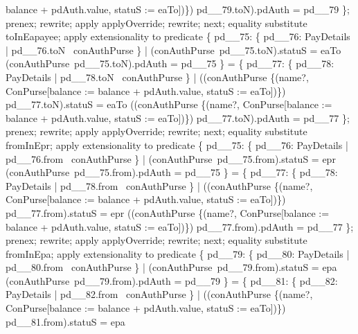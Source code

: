 \begin{LPScript}
\begin{zproof}[lPromotedAuxWorldValType]
                  balance + pdAuth.value, statuS := eaTo])\}) pd\_\_79.toN).pdAuth = pd\_\_79 \};
        prenex;
        rewrite;
        apply applyOverride;
        rewrite;
    next;
        equality substitute toInEapayee;
        apply extensionality to predicate
            \{ pd\_\_75: \{ pd\_\_76: PayDetails | pd\_\_76.toN \in \dom~conAuthPurse \}
              | (conAuthPurse~pd\_\_75.toN).statuS = eaTo
              \land (conAuthPurse~pd\_\_75.toN).pdAuth = pd\_\_75 \}
            = \{ pd\_\_77: \{ pd\_\_78: PayDetails | pd\_\_78.toN \in \dom~conAuthPurse \}
                | ((conAuthPurse \oplus \{(name?, \theta ConPurse[balance :=
                    balance + pdAuth.value, statuS := eaTo])\})
                    pd\_\_77.toN).statuS = eaTo
                \land ((conAuthPurse \oplus \{(name?, \theta ConPurse[balance :=
                    balance + pdAuth.value, statuS := eaTo])\}) pd\_\_77.toN).pdAuth = pd\_\_77 \};
        prenex;
        rewrite;
        apply applyOverride;
        rewrite;
    next;
        equality substitute fromInEpr;
        apply extensionality to predicate
            \{ pd\_\_75: \{ pd\_\_76: PayDetails | pd\_\_76.from \in \dom~conAuthPurse \}
                | (conAuthPurse~pd\_\_75.from).statuS = epr
                \land (conAuthPurse~pd\_\_75.from).pdAuth = pd\_\_75 \}
            = \{ pd\_\_77: \{ pd\_\_78: PayDetails | pd\_\_78.from \in \dom~conAuthPurse \}
                | ((conAuthPurse \oplus \{(name?, \theta ConPurse[balance :=
                balance + pdAuth.value, statuS := eaTo])\}) pd\_\_77.from).statuS = epr
             \land ((conAuthPurse \oplus \{(name?, \theta ConPurse[balance :=
                balance + pdAuth.value, statuS := eaTo])\}) pd\_\_77.from).pdAuth = pd\_\_77 \};
        prenex;
        rewrite;
        apply applyOverride;
        rewrite;
    next;
        equality substitute fromInEpa;
        apply extensionality to predicate
            \{ pd\_\_79: \{ pd\_\_80: PayDetails | pd\_\_80.from \in \dom~conAuthPurse \}
                | (conAuthPurse~pd\_\_79.from).statuS = epa
                \land (conAuthPurse~pd\_\_79.from).pdAuth = pd\_\_79 \}
            = \{ pd\_\_81: \{ pd\_\_82: PayDetails | pd\_\_82.from \in \dom~conAuthPurse \}
                | ((conAuthPurse \oplus \{(name?, \theta ConPurse[balance :=
                balance + pdAuth.value, statuS := eaTo])\}) pd\_\_81.from).statuS = epa

\end{zproof}
\end{LPScript}
